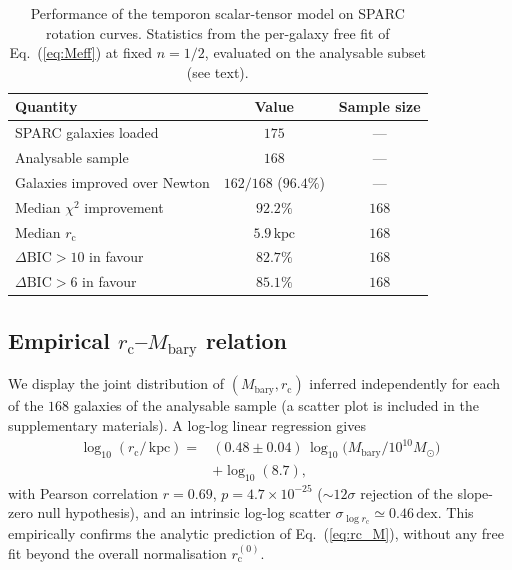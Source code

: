 \documentclass[%
    aps,
    prd,
    reprint,
    superscriptaddress,
    nofootinbib,
    floatfix,
    amsmath,amssymb,
]{revtex4-2}
\newcommand{\Msun}{M_{\odot}}
\newcommand{\Mbary}{M_{\mathrm{bary}}}
\newcommand{\rc}{r_{\mathrm{c}}}
\newcommand{\kpc}{\,\mathrm{kpc}}
\begin{document}
\begin{table}[h]
\caption{\label{tab:sparc} Performance of the temporon scalar-tensor
model on SPARC rotation curves. Statistics from the per-galaxy
free fit of Eq.~(\ref{eq:Meff}) at fixed $n=1/2$, evaluated on
the analysable subset (see text).}
\begin{ruledtabular}
\begin{tabular}{lcc}
Quantity & Value & Sample size \\
\hline
SPARC galaxies loaded              & $175$            & --- \\
Analysable sample                  & $168$            & --- \\
Galaxies improved over Newton      & $162/168$ ($96.4\%$) & --- \\
Median $\chi^{2}$ improvement      & $92.2\%$         & $168$ \\
Median $\rc$                       & $5.9\kpc$        & $168$ \\
$\Delta\mathrm{BIC}>10$ in favour  & $82.7\%$         & $168$ \\
$\Delta\mathrm{BIC}>6$ in favour   & $85.1\%$         & $168$ \\
\end{tabular}
\end{ruledtabular}
\end{table}

\subsection{Empirical $\rc$--$\Mbary$ relation}

We display the joint distribution of $(\Mbary,\rc)$ inferred
independently for each of the $168$ galaxies of the analysable
sample (a scatter plot is included in the supplementary
materials). A log-log linear regression gives
\begin{equation}
\label{eq:rc_M_empirical}
\begin{split}
\log_{10}(\rc/\kpc) = {} & (0.48\pm 0.04)\,
   \log_{10}\!\bigl(\Mbary/10^{10}\Msun\bigr) \\
   {} & + \log_{10}(8.7),
\end{split}
\end{equation}
with Pearson correlation $r = 0.69$, $p = 4.7\times 10^{-25}$
($\sim\!12\sigma$ rejection of the slope-zero null hypothesis),
and an intrinsic log-log scatter
$\sigma_{\log\rc}\simeq 0.46\,\mathrm{dex}$. This empirically
confirms the analytic prediction of Eq.~(\ref{eq:rc_M}), without
any free fit beyond the overall normalisation $\rc^{(0)}$.
\end{document}
